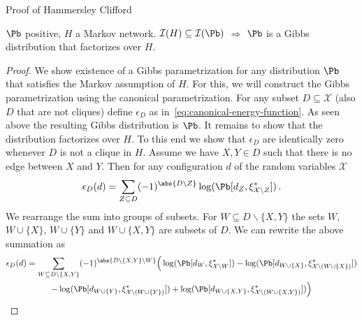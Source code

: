 \begin{frame}{Proof of Hammersley Clifford}
\begin{theorem}
    $\Pb$ positive, $H$ a Markov network. $\mathcal{I}(H) \subseteq \mathcal{I}(\Pb)$ $\Rightarrow$ $\Pb$ is a Gibbs distribution that factorizes over $H$.
\end{theorem}
\begin{proof}
    We show existence of a Gibbs parametrization for any distribution $\Pb$ that satisfies the Markov assumption of $H$.
    \pause
    For this, we will construct the Gibbs parametrization using the canonical parametrization.
    \pause
    For any subset $D \subseteq \mathcal{X}$ (also $D$ that are not cliques) define $\epsilon_D$ as in~\eqref{eq:canonical-energy-function}.
    \pause 
    As seen above the resulting Gibbs distribution is $\Pb$.
    \pause
    It remains to show that the distribution factorizes over $H$.
    \pause 
    To this end we show that $\epsilon_D$ are identically zero whenever $D$ is not a clique in $H$.
    \pause 
    Assume we have $X, Y \in D$ such that there is no edge between $X$ and $Y$.
    \pause
    Then for any configuration $d$ of the random variables $\mathcal{X}$
    \begin{equation}
        \epsilon_D(d) = \sum_{Z \subseteq D} (-1)^{\abs{D \backslash Z}} \log(\Pb[d_Z, \xi^*_{\mathcal{X} \backslash Z}])\,.
    \end{equation}
    \pause 
    We rearrange the sum into groups of subsets.
    For $W \subseteq D \backslash \{X,Y\}$ the sets $W$, $W\cup \{X\}$, $W \cup \{Y\}$ and $W \cup \{X,Y\}$ are subsets of $D$.
    \pause
    We can rewrite the above summation as
    \begin{multline}
        \epsilon_D(d) =  \sum_{W \subseteq D \backslash \{X,Y\}} (-1)^{\abs{D \backslash \{X,Y\} \backslash W}} 
        \Big(
        \log(\Pb[d_W, \xi^*_{\mathcal{X} \backslash W}]) 
        - \log(\Pb[d_{W \cup \{X\}}, \xi^*_{\mathcal{X} \backslash (W \cup \{X\})}]) \\
        - \log(\Pb[d_{W \cup \{Y\}}, \xi^*_{\mathcal{X} \backslash (W \cup \{Y\})}])
        + \log(\Pb[d_{W \cup \{X,Y\}}, \xi^*_{\mathcal{X} \backslash (W \cup \{X,Y\})}])
        \Big)
    \end{multline}
\end{proof}
\end{frame}


